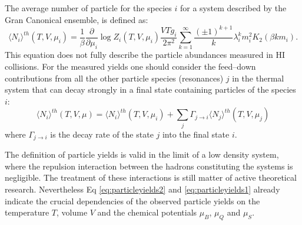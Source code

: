 The average number of particle for the species $i$ for a system described by the Gran
Canonical ensemble, is defined as:
\begin{equation} \label{eq:particleyields1}
    \langle N_{i} \rangle ^{th} (T,V,\mu_{i}) = \frac{1}{\beta} \frac{\partial}{\partial \mu_{i}}
    \log Z_{i}(T,V,\mu_{i})
    \frac{V T g_{i}}{2 \pi^{2}}
    \sum_{k=1}^{\infty} \frac{(\pm 1)^{k+1}}{k} \lambda^{k}_{i} m_{i}^{2} K_{2}(\beta k m_{i}).
\end{equation}
This equation does not fully describe the particle abundances measured in HI collisions.
For the measured yields one should consider the feed–down contributions from all the other
particle species (resonances) $j$ in the thermal system that can decay strongly in a final
state containing particles of the species $i$:
\begin{equation} \label{eq:particleyields2}
    \langle N_{i} \rangle ^{th} (T,V,\mu) = \langle N_{i} \rangle ^{th} (T,V,\mu_{i})
    + \sum_{j} \Gamma_{j \to i} \langle N_{j} \rangle ^{th} (T,V,\mu_{j})
\end{equation}
where $\Gamma_{j \to i}$ is the decay rate of the state $j$ into the final state $i$.

The definition of particle yields is valid in the limit of a low density system, 
where the repulsion interaction between the hadrons constituting the systems is negligible.
The treatment of these interactions is still matter of active theoretical research. Nevertheless 
Eq \ref{eq:particleyields2} and \ref{eq:particleyields1} already indicate the crucial 
dependencies of the observed particle yields on the
temperature $T$, volume $V$ and the chemical potentials $\mu_B$, $\mu_Q$ and $\mu_S$.

